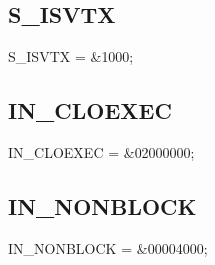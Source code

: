\documentclass{report}
\begin{document}
\subsection*{S{\_}ISVTX}
\begin{list}{}{
\setlength{\itemindent}{0cm}
\setlength{\listparindent}{0cm}
\setlength{\leftmargin}{\evensidemargin}
\addtolength{\leftmargin}{\tmplength}
\settowidth{\labelsep}{X}
\addtolength{\leftmargin}{\labelsep}
\setlength{\labelwidth}{\tmplength}
}
\begin{flushleft}
\item[\textbf{Declaration}\hfill]
\begin{ttfamily}
S{\_}ISVTX = {\&}1000;\end{ttfamily}


\end{flushleft}
\end{list}
\subsection*{IN{\_}CLOEXEC}
\begin{list}{}{
\setlength{\itemindent}{0cm}
\setlength{\listparindent}{0cm}
\setlength{\leftmargin}{\evensidemargin}
\addtolength{\leftmargin}{\tmplength}
\settowidth{\labelsep}{X}
\addtolength{\leftmargin}{\labelsep}
\setlength{\labelwidth}{\tmplength}
}
\begin{flushleft}
\item[\textbf{Declaration}\hfill]
\begin{ttfamily}
IN{\_}CLOEXEC  = {\&}02000000;\end{ttfamily}


\end{flushleft}
\end{list}
\subsection*{IN{\_}NONBLOCK}
\begin{list}{}{
\setlength{\itemindent}{0cm}
\setlength{\listparindent}{0cm}
\setlength{\leftmargin}{\evensidemargin}
\addtolength{\leftmargin}{\tmplength}
\settowidth{\labelsep}{X}
\addtolength{\leftmargin}{\labelsep}
\setlength{\labelwidth}{\tmplength}
}
\begin{flushleft}
\item[\textbf{Declaration}\hfill]
\begin{ttfamily}
IN{\_}NONBLOCK = {\&}00004000;\end{ttfamily}


\end{flushleft}
\end{list}
\end{document}
